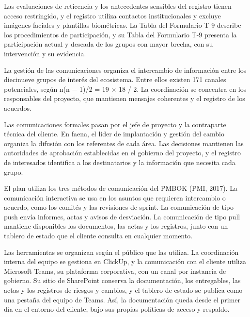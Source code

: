 \documentclass[subdoc]{../../comun/overfore}
\begin{document}
Las evaluaciones de reticencia y los antecedentes sensibles del registro tienen acceso restringido, y el registro utiliza contactos institucionales y excluye imágenes faciales y plantillas biométricas. La Tabla  del Formulario T-9 describe los procedimientos de participación, y su Tabla  del Formulario T-9 presenta la participación actual y deseada de los grupos con mayor brecha, con su intervención y su evidencia.

La gestión de las comunicaciones organiza el intercambio de información entre los diecinueve grupos de interés del ecosistema. Entre ellos existen 171 canales potenciales, según n(n − 1)/2 = 19 × 18 / 2. La coordinación se concentra en los responsables del proyecto, que mantienen mensajes coherentes y el registro de los acuerdos.

Las comunicaciones formales pasan por el jefe de proyecto y la contraparte técnica del cliente. En faena, el líder de implantación y gestión del cambio organiza la difusión con los referentes de cada área. Las decisiones mantienen las autoridades de aprobación establecidas en el gobierno del proyecto, y el registro de interesados identifica a los destinatarios y la información que necesita cada grupo.

El plan utiliza los tres métodos de comunicación del PMBOK (PMI, 2017). La comunicación interactiva se usa en los asuntos que requieren intercambio o acuerdo, como los comités y las revisiones de sprint. La comunicación de tipo push envía informes, actas y avisos de desviación. La comunicación de tipo pull mantiene disponibles los documentos, las actas y los registros, junto con un tablero de estado que el cliente consulta en cualquier momento.

Las herramientas se organizan según el público que las utiliza. La coordinación interna del equipo se gestiona en ClickUp, y la comunicación con el cliente utiliza Microsoft Teams, su plataforma corporativa, con un canal por instancia de gobierno. Su sitio de SharePoint conserva la documentación, los entregables, las actas y los registros de riesgos y cambios, y el tablero de estado se publica como una pestaña del equipo de Teams. Así, la documentación queda desde el primer día en el entorno del cliente, bajo sus propias políticas de acceso y respaldo.
\end{document}

